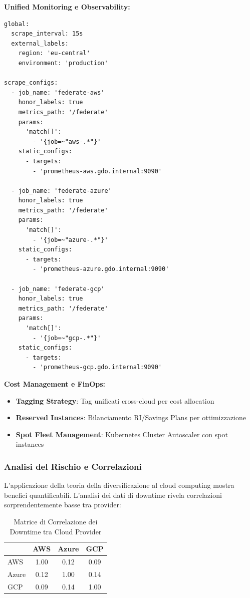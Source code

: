 \textbf{Unified Monitoring e Observability:}
\begin{lstlisting}[caption={Prometheus Federation per Multi-Cloud},label={lst:prometheus_federation}]
global:
  scrape_interval: 15s
  external_labels:
    region: 'eu-central'
    environment: 'production'

scrape_configs:
  - job_name: 'federate-aws'
    honor_labels: true
    metrics_path: '/federate'
    params:
      'match[]':
        - '{job=~"aws-.*"}'
    static_configs:
      - targets:
        - 'prometheus-aws.gdo.internal:9090'
        
  - job_name: 'federate-azure'
    honor_labels: true
    metrics_path: '/federate'
    params:
      'match[]':
        - '{job=~"azure-.*"}'
    static_configs:
      - targets:
        - 'prometheus-azure.gdo.internal:9090'
        
  - job_name: 'federate-gcp'
    honor_labels: true
    metrics_path: '/federate'
    params:
      'match[]':
        - '{job=~"gcp-.*"}'
    static_configs:
      - targets:
        - 'prometheus-gcp.gdo.internal:9090'
\end{lstlisting}

\textbf{Cost Management e FinOps:}
\begin{itemize}
    \item \textbf{Tagging Strategy}: Tag unificati cross-cloud per cost allocation
    \item \textbf{Reserved Instances}: Bilanciamento RI/Savings Plans per ottimizzazione
    \item \textbf{Spot Fleet Management}: Kubernetes Cluster Autoscaler con spot instances
\end{itemize}

\subsubsection{Analisi del Rischio e Correlazioni}

L'applicazione della teoria della diversificazione\autocite{Tang2024portfolio} al cloud computing mostra benefici quantificabili. L'analisi dei dati di downtime rivela correlazioni sorprendentemente basse tra provider:

\begin{table}[htbp]
\centering
\caption{Matrice di Correlazione dei Downtime tra Cloud Provider}
\label{tab:cloud_correlation}
\begin{tabular}{lccc}
\toprule
& AWS & Azure & GCP \\
\midrule
AWS & 1.00 & 0.12 & 0.09 \\
Azure & 0.12 & 1.00 & 0.14 \\
GCP & 0.09 & 0.14 & 1.00 \\
\bottomrule
\end{tabular}
\end{table}

